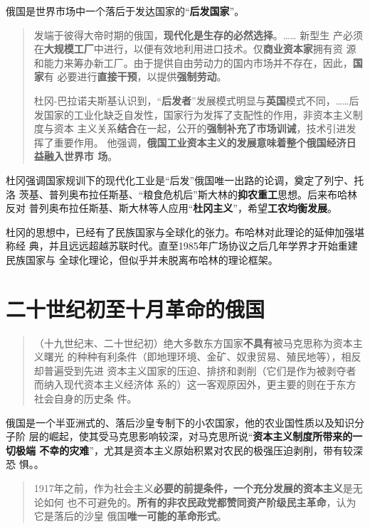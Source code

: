 俄国是世界市场中一个落后于发达国家的“\textbf{后发国家}”。
\begin{quotation}
  发端于彼得大帝时期的俄国，\textbf{现代化是生存的必然选择}。…… 新型生
  产必须在\textbf{大规模工厂}中进行，以便有效地利用进口技术。仅\textbf{商业资本家}拥有资
  源和能力来筹办新工厂。由于提供自由劳动力的国内市场并不存在，因此，\textbf{国家}有
  必要进行\textbf{直接干预}，以提供\textbf{强制劳动}。

  杜冈-巴拉诺夫斯基认识到，“\textbf{后发者}”发展模式明显与\textbf{英国}模式不同，……后
  发国家的工业化缺乏自发性，国家行为发挥了支配性的作用，非资本主义制度与资本
  主义关系\textbf{结合}在一起，公开的\textbf{强制补充了市场训诫}，技术引进发挥了重要作用。
  他强调，\textbf{俄国工业资本主义的发展意味着整个俄国经济日益融入世界市
    场}。\cite[174-175]{mazhengshi}
\end{quotation}

杜冈强调国家规训下的现代化工业是“后发”俄国唯一出路的论调，奠定了列宁、托洛
茨基、普列奥布拉任斯基、“粮食危机后”斯大林的\textbf{抑农重工}思想。后来布哈林反对
普列奥布拉任斯基、斯大林等人应用“\textbf{杜冈主义}”，希望\textbf{工农均衡发展}。

杜冈的思想中，已经有了民族国家与全球化的张力。布哈林对此理论的延伸加强堪称经
典，并且远远超越苏联时代。直至1985年广场协议之后几年学界才开始重建民族国家与
全球化理论，但似乎并未脱离布哈林的理论框架。

\section{二十世纪初至十月革命的俄国}

\begin{quotation}
  （十九世纪末、二十世纪初）绝大多数东方国家\textbf{不具有}被马克思称为资本主义曙光
  的种种有利条件（即地理环境、金矿、奴隶贸易、殖民地等），相反却普遍受到先进
  资本主义国家的压迫、排挤和剥削（它们是作为被剥夺者而纳入现代资本主义经济体
  系的）这一客观原因外，更主要的则在于东方社会自身的历史条
  件。\cite[2-3]{bigrussia}
\end{quotation}

俄国是一个半亚洲式的、落后沙皇专制下的小农国家，他的农业国性质以及知识分子阶
层的崛起，使其受马克思影响较深，对马克思所说“\textbf{资本主义制度所带来的一切极端
  不幸的灾难}”，尤其是资本主义原始积累对农民的极强压迫剥削，带有较深恐
惧。\cite[137]{mazhengshi}。

\begin{quotation}
  1917年之前，作为社会主义\textbf{必要的前提条件，一个充分发展的资本主义}是无论如何
  也不可避免的。\textbf{所有的非农民政党都赞同资产阶级民主革命}，认为它是落后的沙皇
  俄国\textbf{唯一可能的革命形式}。\cite[86]{mazhengshi}
\end{quotation}

